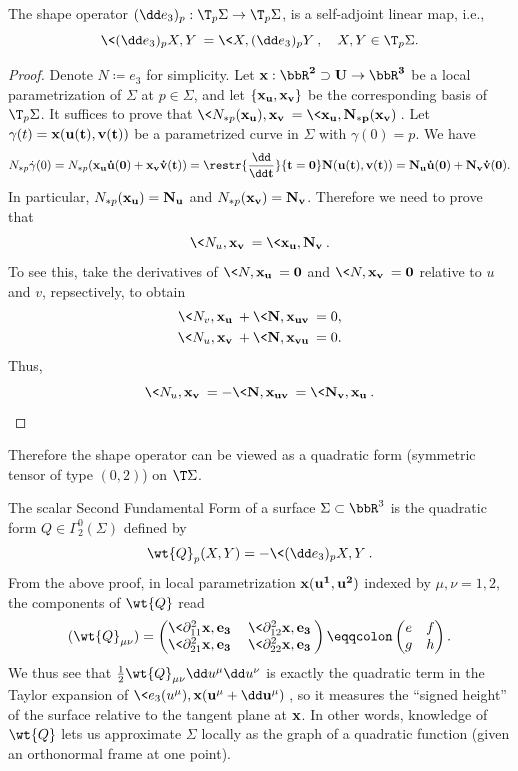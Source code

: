 \begin{lem}
    The shape operator $(\dd e_3)_{p}:\T_p\Sigma\to \T_p\Sigma$, is a self-adjoint linear map, i.e., 
    \[\<(\dd e_3)_{p}X,Y\>=\<X,(\dd e_3)_{p}Y\>,\quad X,Y\in \T_p\Sigma.\]
\end{lem}
\begin{proof}
    Denote $N\coloneqq e_3$ for simplicity. Let $\bf{x}:\bbR^2\supset U\to \bbR^3$ be a local parametrization of $\Sigma$ at $p\in\Sigma$, and let $\{\bf{x}_u, \bf{x}_v\}$ be the corresponding basis of $\T_p\Sigma$. It suffices to prove that $\<N_{\ast p}(\bf{x}_u),\bf{x}_v\>=\<\bf{x}_u,N_{\ast p}(\bf{x}_v)\>$. Let $\gamma(t)=\bf{x}(u(t),v(t))$ be a parametrized curve in $\Sigma$ with $\gamma(0)=p$. We have 
    \[N_{\ast p}\dot\gamma(0)=N_{\ast p}(\bf{x}_u \dot u(0)+\bf{x}_v \dot v(t))=\restr{\frac{\dd}{\dd t}}{t=0}N(u(t),v(t))=N_u \dot u(0)+N_v\dot v(0).\]
    In particular, $N_{\ast p}(\bf{x}_u)=N_u$ and $N_{\ast p}(\bf{x}_v)=N_v$. Therefore we need to prove that 
    \[\<N_u,\bf{x}_v\>=\<\bf{x}_u,N_v\>.\]
    To see this, take the derivatives of $\<N,\bf{x}_u\>=0$ and $\<N,\bf{x}_v\>=0$ relative to $u$ and $v$, repsectively, to obtain 
    \begin{align}
        \<N_v,\bf{x}_u\>+\<N,\bf{x}_{uv}\>&=0,\\
        \<N_u,\bf{x}_v\>+\<N,\bf{x}_{vu}\>&=0.
    \end{align}
    Thus, 
    \[\<N_u,\bf{x}_v\>=-\<N,\bf{x}_{uv}\>=\<N_v,\bf{x}_u\>.\]
\end{proof}

Therefore the shape operator can be viewed as a quadratic form (symmetric tensor of type $(0,2)$) on $\T\Sigma$.

\begin{defn}
    The scalar Second Fundamental Form of a surface $\Sigma\subset\bbR^3$ is the quadratic form $Q\in\Gamma^0_2(\Sigma)$ defined by 
    \[\wt{Q}_p(X,Y)=-\<(\dd e_3)_{p}X,Y\>.\]
    From the above proof, in local parametrization $\bf{x}(u^1,u^2)$ indexed by $\mu,\nu=1,2$, the components of $\wt{Q}$ read 
    \[(\wt{Q}_{\mu\nu})=
    \begin{pmatrix}
        \<\partial^2_{11}\bf{x},e_3\>& \<\partial^2_{12}\bf{x},e_3\>\\
        \<\partial^2_{21}\bf{x},e_3\> & \<\partial^2_{22}\bf{x},e_3\>
    \end{pmatrix}
    \eqqcolon\begin{pmatrix}
        e&f\\
        g&h
    \end{pmatrix}.\label{eq hopf differential components}
    \]
    We thus see that $\frac12\wt{Q}_{\mu\nu}\dd u^\mu \dd u^\nu$ is exactly the quadratic term in the Taylor expansion of $\<e_3(u^\mu),\bf{x}(u^\mu+\dd u^\mu)\>$, so it measures the ``signed height'' of the surface relative to the tangent plane at $\bf{x}$. In other words, knowledge of $\wt{Q}$ lets us approximate $\Sigma$ locally as the graph of a quadratic function (given an orthonormal frame at one point).
\end{defn}


